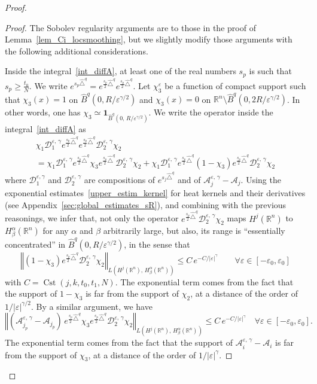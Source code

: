 \documentclass[AHL,Unicode,published]{cedram}
\newcommand*\R{\mathbb{R}}
\newcommand{\calA}{\mathcal{A}}
\newcommand{\calD}{\mathcal{D}}
\newcommand{\bfun}{\mathbf{1}}
\DeclareMathOperator{\Cst}{Cst}
\renewcommand{\geq}{\geqslant}
\renewcommand{\leq}{\leqslant}
\let\oldforall\forall
\renewcommand*{\forall}{\mathrel{\oldforall}}
\begin{document}
\begin{proof}
\begin{proof}
The Sobolev regularity arguments are to those in the proof of Lemma~\ref{lem_Ci_locsmoothing}, but we slightly modify those arguments with the following additional considerations.

Inside the integral~\eqref{int_diffA}, at least one of the real numbers $s_p$ is such that $s_p\geq \frac{t_0}{N}$. We write $e^{s_p \widehat{\triangle}^{q}}=e^{\frac{s_p}{2} \widehat{\triangle}^{q}} e^{\frac{s_p}{2} \widehat{\triangle}^{q}}$. Let $\chi_3^\varepsilon$ be a function of compact support such that $\chi_3(x)=1$ on $\widehat{B}^q(0,R/\varepsilon^{\gamma/2})$ and $\chi_3(x)=0$ on $\R^n\setminus\widehat{B}^q(0,2R/\varepsilon^{\gamma/2})$. In other words, one has $\chi_3\simeq\bfun_{\widehat{B}^q(0,\,R/\varepsilon^{\gamma/2})}$. We write the operator inside the integral~\eqref{int_diffA} as
\begin{multline*}
\chi_1\calD_1^{\varepsilon,\,\gamma} e^{\frac{s_p}{2} \widehat{\triangle}^{q}} e^{\frac{s_p}{2} \widehat{\triangle}^{q}} \calD_2^{\varepsilon,\,\gamma} \chi_2\\
=
\chi_1\calD_1^{\varepsilon,\,\gamma} e^{\frac{s_p}{2} \widehat{\triangle}^{q}} \chi_3 e^{\frac{s_p}{2} \widehat{\triangle}^{q}} \calD_2^{\varepsilon,\,\gamma} \chi_2 
+
\chi_1\calD_1^{\varepsilon,\,\gamma} e^{\frac{s_p}{2} \widehat{\triangle}^{q}} (1-\chi_3) e^{\frac{s_p}{2} \widehat{\triangle}^{q}} \calD_2^{\varepsilon,\,\gamma} \chi_2
\end{multline*}
where $\calD_1^{\varepsilon,\gamma}$ and $\calD_2^{\varepsilon,\,\gamma}$ are compositions of $e^{s_j \widehat{\triangle}^{q}}$ and of $\calA_{j}^{\varepsilon,\,\gamma} - \calA_{j}$. Using the exponential estimates~\eqref{upper_estim_kernel} for heat kernels and their derivatives (see Appendix~\ref{sec:global_estimates_sR}), and combining with the previous reasonings, we infer that, not only the operator $e^{\frac{s_p}{2} \widehat{\triangle}^{q}} \calD_2^{\varepsilon,\,\gamma} \chi_2$ maps $H^j(\R^n)$ to $H^\alpha_\beta(\R^n)$ for any $\alpha$ and $\beta$ arbitrarily large, but also, its range is ``essentially concentrated'' in $\widehat{B}^q(0,R/\varepsilon^{\gamma/2})$, in the sense that
\[
\left\Vert (1-\chi_3) e^{\frac{s_p}{2} \widehat{\triangle}^{q}} \calD_2^{\varepsilon,\,\gamma} \chi_2 \right\Vert_{L\left(H^j(\R^n),\, H^\alpha_\beta(\R^n)\right)} \leq C \, e^{-C/\vert\varepsilon\vert^\gamma} \qquad\forall\varepsilon\in[-\varepsilon_0,\varepsilon_0]
\]
with $C=\Cst(j,k,t_0,t_1,N)$. The exponential term comes from the fact that the support of $1-\chi_3$ is far from the support of $\chi_2$, at a distance of the order of $1/\vert\varepsilon\vert^{\gamma/2}$. By a similar argument, we have
\[
\left\Vert \left(\calA_{j_p}^{\varepsilon,\,\gamma} - \calA_{j_p}\right) \, e^{\frac{s_p}{2} \widehat{\triangle}^{q}} \chi_3 e^{\frac{s_p}{2} \widehat{\triangle}^{q}} \calD_2^{\varepsilon,\,\gamma} \chi_2\right\Vert_{L\left(H^j(\R^n),\, H^\alpha_\beta(\R^n)\right)} \leq C \, e^{-C/\vert\varepsilon\vert^\gamma} \quad\forall\varepsilon\in[-\varepsilon_0,\varepsilon_0].
\]
The exponential term comes from the fact that the support of $\calA_i^{\varepsilon,\,\gamma} - \calA_i$ is far from the support of $\chi_3$, at a distance of the order of $1/\vert\varepsilon\vert^\gamma$.


\end{proof}
\end{proof}
\end{document}
